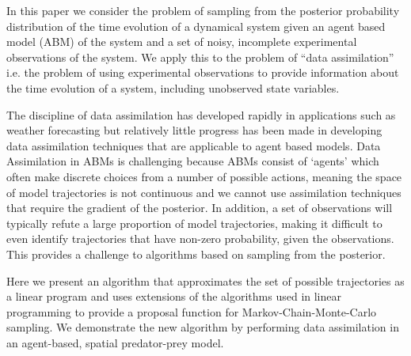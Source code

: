 In this paper we consider the problem of sampling from the posterior probability distribution of the time evolution of a dynamical system given an agent based model (ABM) of the system and a set of noisy, incomplete experimental observations of the system. We apply this to the problem of ``data assimilation'' i.e. the problem of using experimental observations to provide information about the time evolution of a system, including unobserved state variables.

The discipline of data assimilation has developed rapidly in applications such as weather forecasting \cite{kalnay_atmospheric_2003} but relatively little progress has been made in developing data assimilation techniques that are applicable to agent based models. Data Assimilation in ABMs is challenging because ABMs consist of `agents' which often make discrete choices from a number of possible actions, meaning the space of model trajectories is not continuous and we cannot use assimilation techniques that require the gradient of the posterior. In addition, a set of observations will typically refute a large proportion of model trajectories, making it difficult to even identify trajectories that have non-zero probability, given the observations. This provides a challenge to algorithms based on sampling from the posterior.

Here we present an algorithm that approximates the set of possible trajectories as a linear program and uses extensions of the algorithms used in linear programming to provide a proposal function for Markov-Chain-Monte-Carlo sampling. We demonstrate the new algorithm by performing data assimilation in an agent-based, spatial predator-prey model.


